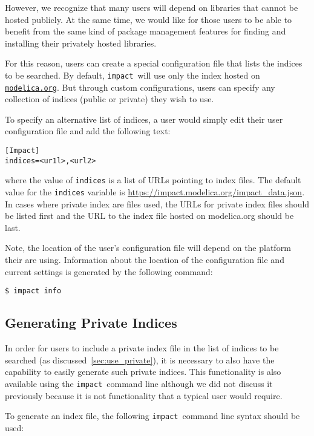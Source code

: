 \documentclass[11pt,a4paper,twocolumn]{article}
\newcommand{\impact}{\texttt{impact}} %
\newcommand{\code}[1]{\texttt{#1}} %
\begin{document}
However, we recognize that many users will depend on libraries that
cannot be hosted publicly.  At the same time, we would like for those
users to be able to benefit from the same kind of package management
features for finding and installing their privately hosted libraries.

For this reason, users can create a special configuration file that
lists the indices to be searched.  By default, \impact\ will use only
the index hosted on \href{https://modelica.org}{\code{modelica.org}}.
But through custom configurations, users can specify any collection of
indices (public or private) they wish to use.

To specify an alternative list of indices, a user would simply edit
their user configuration file and add the following text:

\begin{verbatim}
[Impact]
indices=<ur1l>,<url2>
\end{verbatim}
where the value of \code{indices} is a list of URLs pointing to index
files.  The default value for the \code{indices} variable is
\url{https://impact.modelica.org/impact\_data.json}.  In cases where
private index are files used, the URLs for private index files should
be listed first and the URL to the index file hosted on modelica.org
should be last.

Note, the location of the user's configuration file will depend on the
platform their are using.  Information about the location of the
configuration file and current settings is generated by the following
command:

\begin{verbatim}
$ impact info
\end{verbatim}

\subsection{Generating Private Indices}
\label{sec:gen_private}


In order for users to include a private index file in the list of
indices to be searched (as discussed~\ref{sec:use_private}), it is
necessary to also have the capability to easily generate such private
indices.  This functionality is also available using the
\impact\ command line although we did not discuss it previously
because it is not functionality that a typical user would require.

To generate an index file, the following \impact\ command line syntax
should be used:
\end{document}
